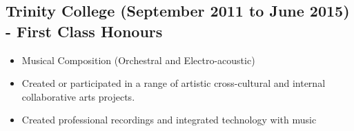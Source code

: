 \documentclass[12pt]{IEEEtran}
\begin{document}
\subsection*{Trinity College (September 2011 to June 2015) - First Class Honours}
\begin{itemize}
\item Musical Composition (Orchestral and Electro-acoustic)
\item Created or participated in a range of artistic cross-cultural and internal collaborative arts projects.
\item Created professional recordings and integrated technology with music
\end{itemize}




\newpage


\end{document}
